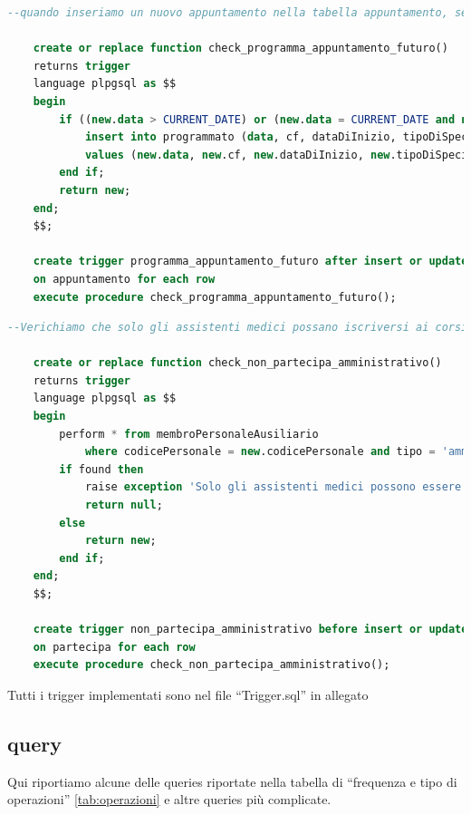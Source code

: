 \documentclass[11pt]{article}
\begin{document}
\begin{lstlisting}[language=SQL]
    --quando inseriamo un nuovo appuntamento nella tabella appuntamento, se e' un appuntamento futuro lo inseriamo anche in nella tabella Programmato

    create or replace function check_programma_appuntamento_futuro()
    returns trigger
    language plpgsql as $$
    begin
        if ((new.data > CURRENT_DATE) or (new.data = CURRENT_DATE and new.ora > extract(hour from CURRENT_TIME))) then
            insert into programmato (data, cf, dataDiInizio, tipoDiSpecializzazione, ora)
            values (new.data, new.cf, new.dataDiInizio, new.tipoDiSpecializzazione, new.ora);
        end if;
        return new;
    end;
    $$;
    
    create trigger programma_appuntamento_futuro after insert or update
    on appuntamento for each row
    execute procedure check_programma_appuntamento_futuro();
\end{lstlisting}
\begin{lstlisting}[language=SQL]
    --Verichiamo che solo gli assistenti medici possano iscriversi ai corsi di aggiornamento

    create or replace function check_non_partecipa_amministrativo()
    returns trigger
    language plpgsql as $$
    begin
        perform * from membroPersonaleAusiliario
            where codicePersonale = new.codicePersonale and tipo = 'amministrativo';
        if found then
            raise exception 'Solo gli assistenti medici possono essere iscritti ai corsi di aggiornamento';
            return null;
        else
            return new;
        end if;
    end;
    $$;
    
    create trigger non_partecipa_amministrativo before insert or update
    on partecipa for each row
    execute procedure check_non_partecipa_amministrativo();
\end{lstlisting}
Tutti i trigger implementati sono nel file ``Trigger.sql'' in allegato
\subsection{query}
Qui riportiamo alcune delle queries riportate nella tabella di ``frequenza e tipo di operazioni'' \ref{tab:operazioni} e altre queries più complicate.
\end{document}
